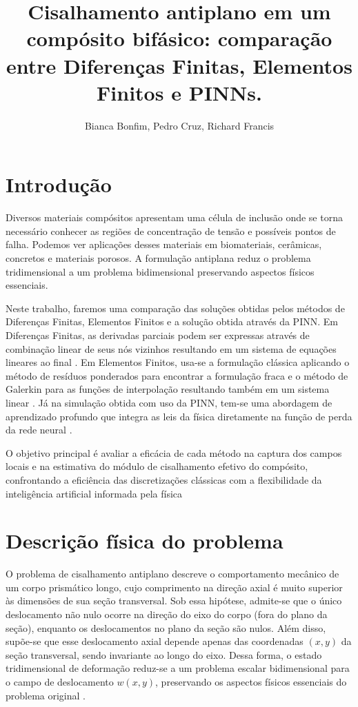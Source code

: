 \documentclass[brazil]{TCAM} %
\title{Cisalhamento antiplano em um compósito bifásico: comparação entre Diferenças
Finitas, Elementos Finitos e PINNs.}
\author{Bianca Bonfim, Pedro Cruz, Richard Francis
}
\begin{document}

\maketitle


\section{Introdução}

Diversos materiais compósitos apresentam uma célula de inclusão onde se torna necessário conhecer as regiões de concentração de tensão e possíveis pontos de falha. Podemos ver aplicações desses materiais em biomateriais, cerâmicas, concretos e materiais porosos.
A formulação antiplana reduz o problema tridimensional a um problema bidimensional preservando aspectos físicos essenciais.

Neste trabalho, faremos uma comparação das soluções obtidas pelos métodos de Diferenças Finitas, Elementos Finitos e a solução obtida através da PINN. Em Diferenças Finitas, as derivadas parciais podem ser expressas através de combinação linear de seus nós vizinhos resultando em um sistema de equações lineares ao final \cite{lin2021simulation}\cite{leveque2007}. Em Elementos Finitos, usa-se a formulação clássica aplicando o método de resíduos ponderados para encontrar a formulação fraca e o método de Galerkin para as funções de interpolação resultando também em um sistema linear \cite{logan}. Já na simulação obtida com uso da PINN, tem-se uma abordagem de aprendizado profundo que integra as leis da física diretamente na função de perda da rede neural \cite{raissi2019pinn,karniadakis2021physics,lu2021deepxde}.

O objetivo principal é avaliar a eficácia de cada método na captura dos campos locais e na estimativa do módulo de cisalhamento efetivo do compósito, confrontando a eficiência das discretizações clássicas com a flexibilidade da inteligência artificial informada pela física


\section{Descrição física do problema}

O problema de cisalhamento antiplano descreve o comportamento mecânico de um corpo prismático longo, cujo comprimento na direção axial é muito superior às dimensões de sua seção transversal. Sob essa hipótese, admite-se que o único deslocamento não nulo ocorre na direção do eixo do corpo (fora do plano da seção), enquanto os deslocamentos no plano da seção são nulos. Além disso, supõe-se que esse deslocamento axial depende apenas das coordenadas $(x,y)$ da seção transversal, sendo invariante ao longo do eixo. Dessa forma, o estado tridimensional de deformação reduz-se a um problema escalar bidimensional para o campo de deslocamento $w(x,y)$, preservando os aspectos físicos essenciais do problema original \cite{lin2021simulation}.
\end{document}
